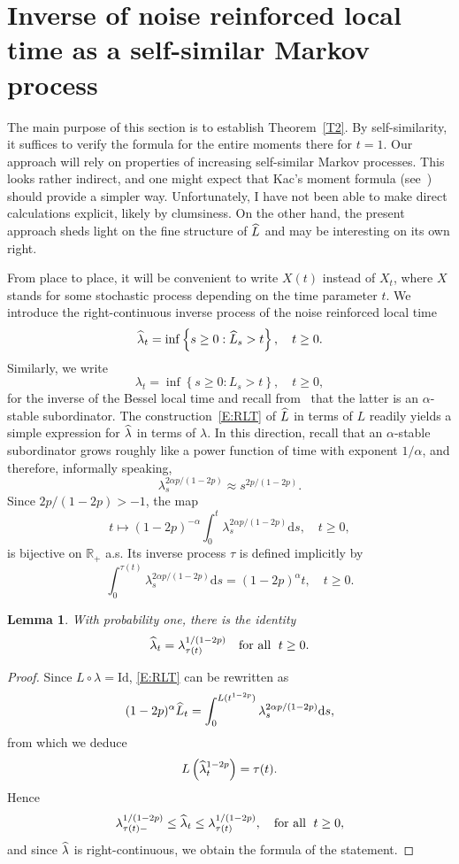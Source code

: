 \documentclass[10pt]{amsart}
\newtheorem{lemm}[theo]{Lemma}\newtheorem{prop}[theo]{Proposition}\newtheorem{coro}[theo]{Corollary}\newtheorem{conj}[theo]{Conjecture}
\theoremstyle{definition}\newtheorem{defi}[theo]{Definition}\newtheorem{rema}[theo]{Remark}\newtheorem{exam}[theo]{Example}\newtheorem{exem}[theo]{Example}\newtheorem{nota}[theo]{Notation}
\renewcommand{\hat}[1]{\widehat{#1}}
\newcommand{\dd}{\mathrm{d}}
\newcommand{\rmId}{\mathrm{Id}}
\newcommand{\R}{\mathbb{R}}
\let\oldhat\hat
\renewcommand*{\hat}[1]{\mathchoice{\widehat{#1}}{\widehat{#1}}{\oldhat{#1}}{\oldhat{#1}}}
\begin{document}
\section{Inverse of noise reinforced local time as a self-similar Markov process}\label{sec:inverseRLT}
The main purpose of this section is to establish Theorem~\ref{T2}. By self-similarity, it suffices to verify the formula for the entire moments there for $t=1$. Our approach will rely on properties of increasing self-similar Markov processes. This looks rather indirect, and one might expect that Kac's moment formula (see~\cite{FP}) should provide a simpler way. Unfortunately, I have not been able to make direct calculations explicit, likely by clumsiness. On the other hand, the present approach sheds light on the fine structure of $\hat{L}$ and may be interesting on its own right.

From place to place, it will be convenient to write $X(t)$ instead of $X_t$, where $X$ stands for some stochastic process depending on the time parameter $t$. We introduce the right-continuous inverse process of the noise reinforced local time
\[
\hat \lambda_t=\inf\left\{s\geq 0: \hat{L}_s>t\right\}, \quad t\geq 0.
\]
Similarly, we write
\[
\lambda_t=\inf\left\{s\geq 0: {L}_s>t\right\}, \quad t\geq 0,
\]
for the inverse of the Bessel local time and recall from~\cite[Proposition~3.2]{DRVY} that the latter is an $\alpha$-stable subordinator. The construction~\eqref{E:RLT} of $\hat{L}$ in terms of ${L}$ readily yields a simple expression for $\hat \lambda$ in terms of $\lambda$. In this direction, recall that an $\alpha$-stable subordinator grows roughly like a power function of time with exponent $1/\alpha$, and therefore, informally speaking,
\[
\lambda_s^{2\alpha p/(1-2p)}\approx s^{2p/(1-2p)}.
\]
Since $2p/(1-2p)>-1$, the map
\[
t\mapsto (1-2p)^{-\alpha} \int_0^{t} \lambda_s^{2\alpha p/(1-2p)} \dd s, \quad t\geq 0,
\]
is bijective on $\R_+$ a.s. Its inverse process $\tau$ is defined implicitly by
\begin{equation}\label{E:rho}
\int_0^{\tau(t)} \lambda_s^{2\alpha p/(1-2p)} \dd s = (1-2p)^{\alpha} t, \quad t\geq 0.
\end{equation}

\begin{lemm}\label{L5}
With probability one, there is the identity
\[
\hat \lambda_t= \lambda_{\tau(t)}^{1/(1-2p)}\quad \text{for all }\; t\geq 0.
\]
\end{lemm}

\begin{proof}
Since $L\circ \lambda = \rmId$, \eqref{E:RLT} can be rewritten as
\[
(1-2p)^{\alpha} \hat{L}_t= \int_0^{L(t^{1-2p})} \lambda_s^{2\alpha p/(1-2p)} \dd s,
\]
from which we deduce
\[
L\left(\hat \lambda_t^{1-2p}\right)=\tau(t).
\]
Hence
\[
\lambda_{\tau(t)-}^{1/(1-2p)}\leq \hat \lambda_t \leq \lambda_{\tau(t)}^{1/(1-2p)}, \quad \text{for all }\; t\geq 0,
\]
and since $\hat \lambda$ is right-continuous, we obtain the formula of the statement.
\end{proof}
\end{document}
